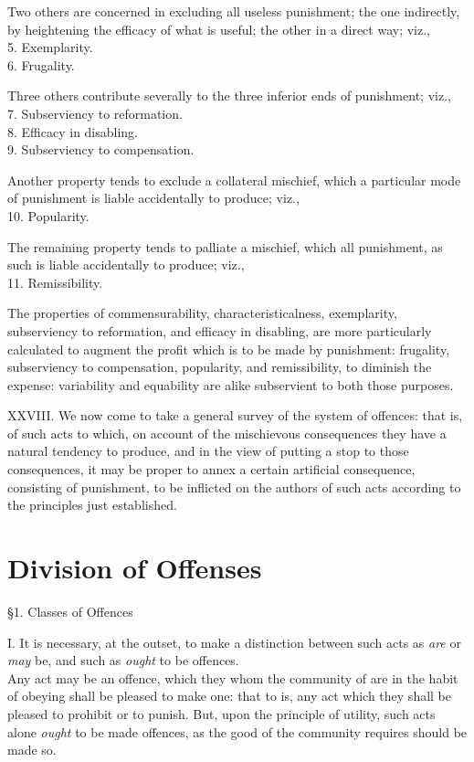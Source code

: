 \documentclass[12pt]{report}
\begin{document}
Two others are concerned in excluding all useless punishment; the one
indirectly, by heightening the efficacy of what is useful; the other in
a direct way; viz.,\\
5. Exemplarity.\\
6. Frugality.

Three others contribute severally to the three inferior ends of
punishment; viz.,\\
7. Subserviency to reformation.\\
8. Efficacy in disabling.\\
9. Subserviency to compensation.

Another property tends to exclude a collateral mischief, which a
particular mode of punishment is liable accidentally to produce; viz.,\\
10. Popularity.

The remaining property tends to palliate a mischief, which all
punishment, as such is liable accidentally to produce; viz.,\\
11. Remissibility.

The properties of commensurability, characteristicalness, exemplarity,
subserviency to reformation, and efficacy in disabling, are more
particularly calculated to augment the profit which is to be made by
punishment: frugality, subserviency to compensation, popularity, and
remissibility, to diminish the expense: variability and equability are
alike subservient to both those purposes.

XXVIII. We now come to take a general survey of the system of offences:
that is, of such acts to which, on account of the mischievous
consequences they have a natural tendency to produce, and in the view of
putting a stop to those consequences, it may be proper to annex a
certain artificial consequence, consisting of punishment, to be
inflicted on the authors of such acts according to the principles just
established.

\chapter{Division of Offenses}

§1. Classes of Offences

I. It is necessary, at the outset, to make a distinction between such
acts as \emph{are} or \emph{may} be, and such as \emph{ought} to be
offences.\\
Any act may be an offence, which they whom the community of are in the
habit of obeying shall be pleased to make one: that to is, any act which
they shall be pleased to prohibit or to punish. But, upon the principle
of utility, such acts alone \emph{ought} to be made offences, as the
good of the community requires should be made so.
\end{document}
